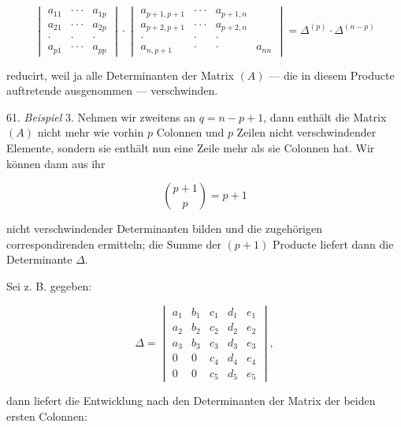 \documentclass[11pt]{article}
\providecommand{\weberpage}[1]{}
\let\Delta\varDelta
\begin{document}
\[
\begin{vmatrix}
a_{11} & \cdot\cdot\cdot & a_{1p} \\
a_{21} & \cdot\cdot\cdot & a_{2p} \\
\cdot & \cdot & \cdot \\
a_{p1} & \cdot\cdot\cdot & a_{pp}
\end{vmatrix}
\cdot
\begin{vmatrix}
a_{p+1,p+1} & \cdot\cdot\cdot & a_{p+1,n} \\
a_{p+2,p+1} & \cdot\cdot\cdot & a_{p+2,n} \\
\cdot & \cdot & \cdot \\
a_{n,p+1} & \cdot & \cdot & a_{nn}
\end{vmatrix}
= \Delta^{(p)} \cdot \Delta^{(n-p)}
\]

reducirt, weil ja alle Determinanten der Matrix $(A)$ --- die in diesem Producte auftretende
ausgenommen --- verschwinden.

61. \textit{Beispiel} 3. Nehmen wir zweitens an $q = n - p + 1$, dann enth\"alt die Matrix
$(A)$ nicht mehr wie vorhin $p$ Colonnen und $p$ Zeilen nicht verschwindender Elemente,
sondern sie enth\"alt nun eine Zeile mehr als sie Colonnen hat. Wir k\"onnen dann aus ihr

\[
\binom{p+1}{p} = p+1
\]

nicht verschwindender Determinanten bilden und die zugeh\"origen correspondirenden
ermitteln; die Summe der $(p+1)$ Producte liefert dann die Determinante $\Delta$.

Sei z. B. gegeben:

\[
\Delta = \begin{vmatrix}
a_1 & b_1 & c_1 & d_1 & e_1 \\
a_2 & b_2 & c_2 & d_2 & e_2 \\
a_3 & b_3 & c_3 & d_3 & e_3 \\
0 & 0 & c_4 & d_4 & e_4 \\
0 & 0 & c_5 & d_5 & e_5
\end{vmatrix},
\]


\weberpage{67}
dann liefert die Entwicklung nach den Determinanten der Matrix der beiden ersten Colonnen:
\end{document}
